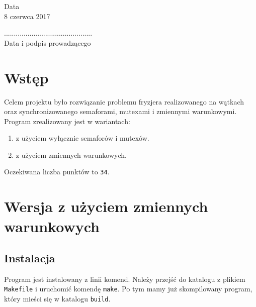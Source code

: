\documentclass[12pt,a4paper]{article}
\newcommand{\datazajec}{8 czerwca 2017}
\begin{document}
	\begin{minipage}[t]{0.4\linewidth}
		\centering
		Data \\
		\small \datazajec
	\end{minipage}
	
	\begin{flushright}
		\begin{minipage}[t]{0.5\linewidth}
			\centering
			............................................. \\
			\small \textsf{Data i podpis prowadzącego}
		\end{minipage}
	\end{flushright}
	\pagebreak

	\tableofcontents

	\pagebreak

	
	\section{Wstęp}
	Celem projektu było rozwiązanie problemu fryzjera realizowanego na wątkach oraz 
	synchronizowanego semaforami, mutexami i zmiennymi warunkowymi.\\
	Program zrealizowany jest w wariantach:
	\begin{enumerate}[label=\alph*)]
		\item z użyciem wyłącznie semaforów i mutexów.
		\item z użyciem zmiennych warunkowych.
	\end{enumerate}
	Oczekiwana liczba punktów to \texttt{34}.
	
	\section{Wersja z użyciem zmiennych warunkowych}
	\subsection{Instalacja}
	Program jest instalowany z linii komend. Należy przejść do katalogu z plikiem 
	\texttt{Makefile} i uruchomić komendę \texttt{make}. Po tym mamy już skompilowany 
	program, który mieści się w katalogu \texttt{build}.

	
\end{document}
